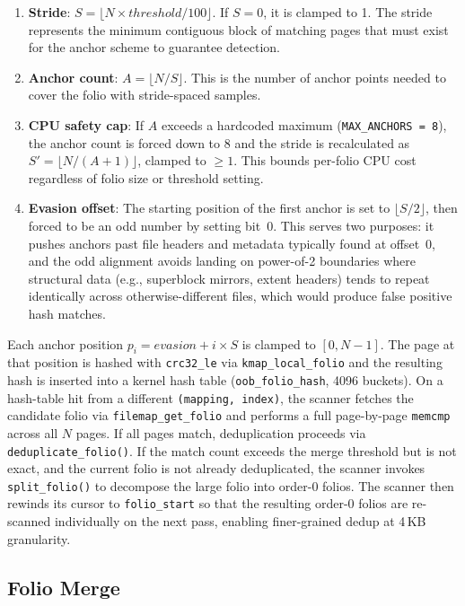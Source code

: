 \documentclass[conference]{IEEEtran}
\begin{document}
\begin{enumerate}
    \item \textbf{Stride}: $S = \lfloor N \times \mathit{threshold} / 100 \rfloor$. If $S = 0$, it is clamped to 1. The stride represents the minimum contiguous block of matching pages that must exist for the anchor scheme to guarantee detection.
    \item \textbf{Anchor count}: $A = \lfloor N / S \rfloor$. This is the number of anchor points needed to cover the folio with stride-spaced samples.
    \item \textbf{CPU safety cap}: If $A$ exceeds a hardcoded maximum (\texttt{MAX\_ANCHORS = 8}), the anchor count is forced down to 8 and the stride is recalculated as $S' = \lfloor N / (A + 1) \rfloor$, clamped to $\geq 1$. This bounds per-folio CPU cost regardless of folio size or threshold setting.
    \item \textbf{Evasion offset}: The starting position of the first anchor is set to $\lfloor S / 2 \rfloor$, then forced to be an odd number by setting bit~0. This serves two purposes: it pushes anchors past file headers and metadata typically found at offset~0, and the odd alignment avoids landing on power-of-2 boundaries where structural data (e.g., superblock mirrors, extent headers) tends to repeat identically across otherwise-different files, which would produce false positive hash matches.
\end{enumerate}

Each anchor position $p_i = \mathit{evasion} + i \times S$ is clamped to $[0, N{-}1]$. The page at that position is hashed with \texttt{crc32\_le} via \texttt{kmap\_local\_folio} and the resulting hash is inserted into a kernel hash table (\texttt{oob\_folio\_hash}, 4096 buckets). On a hash-table hit from a different \texttt{(mapping, index)}, the scanner fetches the candidate folio via \texttt{filemap\_get\_folio} and performs a full page-by-page \texttt{memcmp} across all $N$ pages. If all pages match, deduplication proceeds via \texttt{deduplicate\_folio()}. If the match count exceeds the merge threshold but is not exact, and the current folio is not already deduplicated, the scanner invokes \texttt{split\_folio()} to decompose the large folio into order-0 folios. The scanner then rewinds its cursor to \texttt{folio\_start} so that the resulting order-0 folios are re-scanned individually on the next pass, enabling finer-grained dedup at 4\,KB granularity.

\subsection{Folio Merge}
\end{document}
